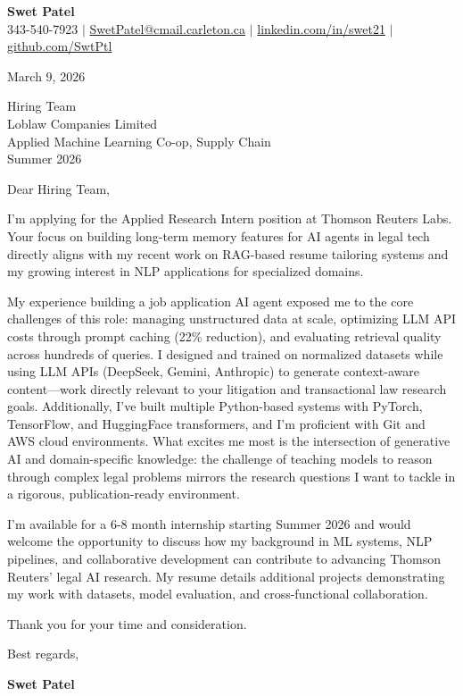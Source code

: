 \documentclass[letterpaper,11pt]{article}
\begin{document}
\begin{center}
    \textbf{\Large Swet Patel} \\[4pt]
    \small 343-540-7923 $|$
    \href{mailto:SwetPatel@cmail.carleton.ca}{SwetPatel@cmail.carleton.ca} $|$
    \href{https://linkedin.com/in/swet21}{linkedin.com/in/swet21} $|$
    \href{https://github.com/SwtPtl}{github.com/SwtPtl}
\end{center}

\vspace{8pt}
March 9, 2026

\vspace{8pt}
Hiring Team \\
Loblaw Companies Limited \\
Applied Machine Learning Co-op, Supply Chain \\
Summer 2026

\vspace{12pt}
Dear Hiring Team,


I'm applying for the Applied Research Intern position at Thomson Reuters Labs. Your focus on building long-term memory features for AI agents in legal tech directly aligns with my recent work on RAG-based resume tailoring systems and my growing interest in NLP applications for specialized domains.

\vspace{12pt}

My experience building a job application AI agent exposed me to the core challenges of this role: managing unstructured data at scale, optimizing LLM API costs through prompt caching (22\% reduction), and evaluating retrieval quality across hundreds of queries. I designed and trained on normalized datasets while using LLM APIs (DeepSeek, Gemini, Anthropic) to generate context-aware content—work directly relevant to your litigation and transactional law research goals. Additionally, I've built multiple Python-based systems with PyTorch, TensorFlow, and HuggingFace transformers, and I'm proficient with Git and AWS cloud environments. What excites me most is the intersection of generative AI and domain-specific knowledge: the challenge of teaching models to reason through complex legal problems mirrors the research questions I want to tackle in a rigorous, publication-ready environment.

\vspace{12pt}

I'm available for a 6-8 month internship starting Summer 2026 and would welcome the opportunity to discuss how my background in ML systems, NLP pipelines, and collaborative development can contribute to advancing Thomson Reuters' legal AI research. My resume details additional projects demonstrating my work with datasets, model evaluation, and cross-functional collaboration.

\vspace{12pt}
Thank you for your time and consideration.

\vspace{16pt}
Best regards,

\vspace{4pt}
\textbf{Swet Patel}
\end{document}
